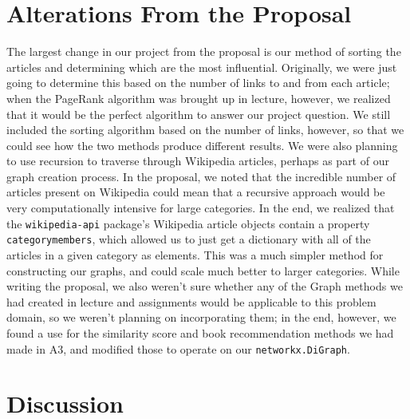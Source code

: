 \documentclass[fontsize=11pt]{article}
\begin{document}
\section{Alterations From the Proposal}
\noindent The largest change in our project from the proposal is our method of sorting the articles and determining which are the most influential. Originally, we were just going to determine this based on the number of links to and from each article; when the PageRank algorithm was brought up in lecture, however, we realized that it would be the perfect algorithm to answer our project question. We still included the sorting algorithm based on the number of links, however, so that we could see how the two methods produce different results.
We were also planning to use recursion to traverse through Wikipedia articles, perhaps as part of our graph creation process. In the proposal, we noted that the incredible number of articles present on Wikipedia could mean that a recursive approach would be very computationally intensive for large categories. In the end, we realized that the \texttt{wikipedia-api} package's Wikipedia article objects contain a property \texttt{categorymembers}, which allowed us to just get a dictionary with all of the articles in a given category as elements. This was a much simpler method for constructing our graphs, and could scale much better to larger categories.
While writing the proposal, we also weren't sure whether any of the Graph methods we had created in lecture and assignments would be applicable to this problem domain, so we weren't planning on incorporating them; in the end, however, we found a use for the similarity score and book recommendation methods we had made in A3, and modified those to operate on our \texttt{networkx.DiGraph}.

\section{Discussion}
\noindent
\end{document}
